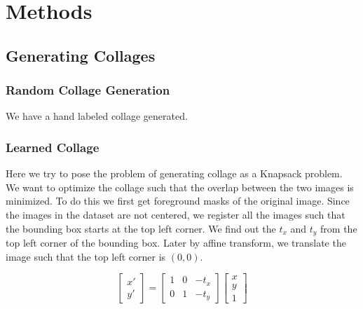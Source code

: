 \documentclass{article}
\begin{document}
\section{ Methods }

\subsection{Generating Collages}

\subsubsection{Random Collage Generation}
We have a hand labeled collage generated. 




\subsubsection{Learned Collage}
Here we try to pose the problem of generating collage as a Knapsack problem. We want to optimize the collage such that the overlap between the two images is minimized. To do this we first get foreground masks of the original image. Since the images in the dataset are not centered, we register all the images such that the bounding box starts at the top left corner. We find out the $t_{x}$ and $t_{y}$  from the top left corner of the bounding box. Later by affine transform, we translate the image such that the top left corner is $(0,0)$.  

\begin{equation}
\begin{bmatrix}
x'\\
y'
\end{bmatrix}
= 
\begin{bmatrix}
1 & 0 & -t_{x}\\
0 & 1 & -t_{y}
\end{bmatrix}
\begin{bmatrix}
x\\
y\\
1
\end{bmatrix}
\end{equation}
\end{document}
